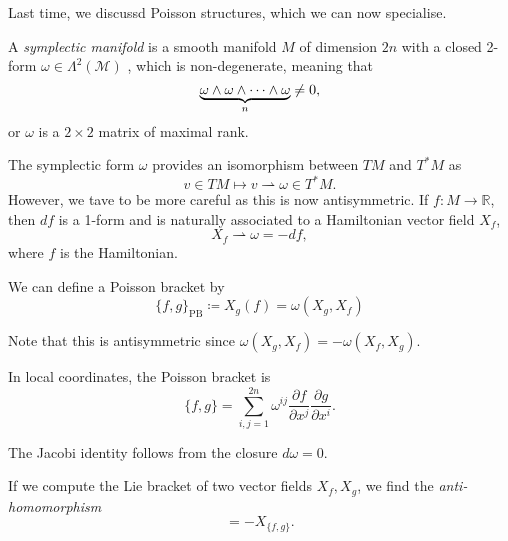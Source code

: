 
Last time, we discussd Poisson structures, which we can now specialise.

\begin{definition}
  A \emph{symplectic manifold} is a smooth manifold $M$  of dimension $2n$  with a closed 2-form $\omega \in \Lambda^{2}(\mathcal{M})$ , which is non-degenerate, meaning that
  \begin{equation}
    \underbrace{\omega \wedge \omega \wedge \dots \wedge \omega}_{\mathclap{n}} \neq 0,
  \end{equation}
  or $\omega$ is a $2 \times 2$ matrix of maximal rank.
\end{definition}

The symplectic form $\omega$ provides an isomorphism between $TM$ and $T^*M$ as
\begin{equation}
  v \in TM \mapsto v \rightharpoonup \omega \in T^*M.
\end{equation}
However, we tave to be more careful as this is now antisymmetric.
If $f \colon M \to \mathbb{R}$, then $df$ is a 1-form and is naturally associated to a Hamiltonian vector field $X_f$,
\begin{equation}
  X_f \rightharpoonup \omega = -d f,
\end{equation}
where $f$ is the Hamiltonian.

\begin{claim}
  We can define a Poisson bracket by
  \begin{equation}
    \{ f, g \}_{\text{PB}} \coloneqq X_g(f) = \omega(X_g, X_f)
  \end{equation}
\end{claim}
\begin{remark}
  Note that this is antisymmetric since $\omega(X_g, X_f) = - \omega(X_f, X_g)$.
\end{remark}

In local coordinates, the Poisson bracket is
\begin{equation}
  \{f, g\} = \sum_{i, j = 1}^{2n} \omega^{ij} \frac{\partial f}{\partial x^{j}} \frac{\partial g}{\partial x^{i}}.
\end{equation}
\begin{exercise}
  The Jacobi identity follows from the closure $d\omega = 0$.
\end{exercise}

If we compute the Lie bracket of two vector fields $X_f, X_g$, we find the \emph{anti-homomorphism}
\begin{equation}
  [X_f, X_g] = - X_{\{f, g\}}.
\end{equation}

